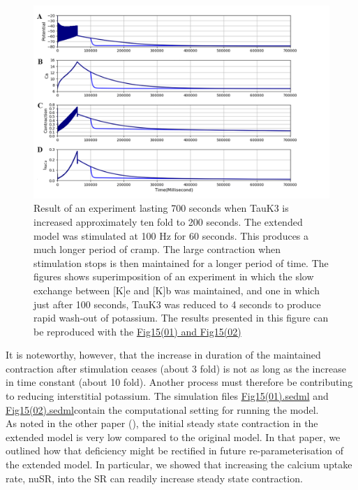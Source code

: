 \documentclass[fleqn,10pt]{physiome}
\begin{document}
\begin{figure}[h!]
\centering
\includegraphics[width=0.9\linewidth]{figure14}
\caption{Result of an experiment lasting 700 seconds when TauK3 is increased approximately ten fold to 200 seconds. The extended model was stimulated at 100 Hz for 60 seconds. This produces a much longer period of cramp. The large contraction when stimulation stops is then maintained for a longer period of time. The figures shows superimposition of an experiment in which the slow exchange between [K]e and [K]b was maintained, and one in which just after 100 seconds, TauK3 was reduced to 4 seconds to produce rapid wash-out of potassium. The results presented in this figure can be reproduced with the \href{https://models.physiomeproject.org/workspace/5f4/file/26289d9227fbf4f66ca8106d8bf80ff9a51a5ac6/Fig15(01).sedml}{Fig15(01) and \href{https://models.physiomeproject.org/workspace/5f4/file/26289d9227fbf4f66ca8106d8bf80ff9a51a5ac6/Fig15(02).sedml}{Fig15(02)}}}
\label{fig14}
\end{figure}\newline

It is noteworthy, however, that the increase in duration of the maintained contraction after stimulation ceases (about 3 fold) is not as long as the increase in time constant (about 10 fold). Another process must therefore be contributing to reducing interstitial potassium. The simulation files \href{http://models.cellml.org/workspace/5f4/file/099d70c2ee6ed5dfb1ca33e0ce16db4f0247a4dc/Fig15(01).sedml}{Fig15(01).sedml} and \href{http://models.cellml.org/workspace/5f4/file/099d70c2ee6ed5dfb1ca33e0ce16db4f0247a4dc/Fig15(02).sedml}{Fig15(02).sedml}contain the computational setting for running the model.\\


As noted in the other paper (\citep{Noble2019Incorporation}), the initial steady state contraction in the extended model is very low compared to the original model. In that paper, we outlined how that deficiency might be rectified in future re-parameterisation of the extended model. In particular, we showed that increasing the calcium uptake rate, nuSR, into the SR can readily increase steady state contraction.\newpage 
\end{document}
